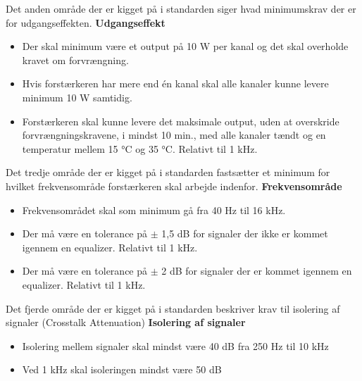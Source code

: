 Det anden område der er kigget på i standarden siger hvad minimumskrav der er for udgangseffekten.
\newline
\newline
\textbf{Udgangseffekt}
\begin{itemize}
\item Der skal minimum være et output på 10 W per kanal og det skal overholde kravet om forvrængning.
\item Hvis forstærkeren har mere end én kanal skal alle kanaler kunne levere minimum 10 W samtidig.
\item Forstærkeren skal kunne levere det maksimale output, uden at overskride forvrængningskravene, i mindst 10 min., med alle kanaler tændt og en temperatur mellem 15 °C og 35 °C. Relativt til 1 kHz.
\end{itemize}

Det tredje område der er kigget på i standarden fastsætter et minimum for hvilket frekvensområde forstærkeren skal arbejde indenfor.
\newline 
\newline
\textbf{Frekvensområde}
\begin{itemize}
\item Frekvensområdet skal som minimum gå fra 40 Hz til 16 kHz.
\item Der må være en tolerance på $\pm$ 1,5 dB for signaler der ikke er kommet igennem en equalizer. Relativt til 1 kHz.
\item Der må være en tolerance på $\pm$ 2 dB for signaler der er kommet igennem en equalizer. Relativt til 1 kHz.
\end{itemize}

Det fjerde område der er kigget på i standarden beskriver krav til isolering af signaler (Crosstalk Attenuation)
\newline 
\newline
\textbf{Isolering af signaler}
\begin{itemize}
\item Isolering mellem signaler skal mindst være 40 dB fra 250 Hz til 10 kHz
\item Ved 1 kHz skal isoleringen mindst være 50 dB
\end{itemize}


